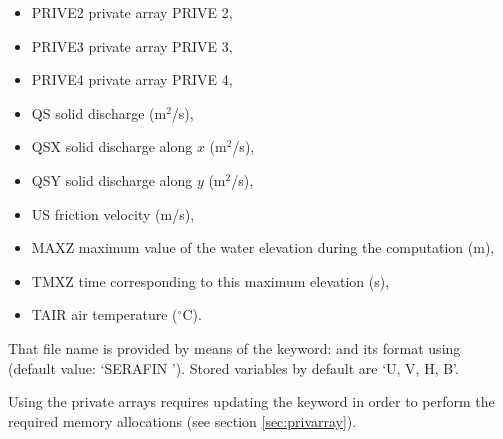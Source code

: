 \begin{itemize}
\item PRIVE2 private array PRIVE 2,

\item PRIVE3 private array PRIVE 3,

\item PRIVE4 private array PRIVE 4,

\item QS  solid discharge (m${}^{2}$/s),

\item QSX  solid discharge along $x$ (m${}^{2}$/s),

\item QSY  solid discharge along $y$ (m${}^{2}$/s),

\item US  friction velocity (m/s),

\item MAXZ  maximum value of the water elevation during the computation (m),

\item TMXZ  time corresponding to this maximum elevation (s),








\item TAIR  air temperature ($^{\circ}$C).
\end{itemize}

That file name is provided by means of the keyword:  and
its format using  (default value: `SERAFIN ').
Stored variables by default are `U, V, H, B'.

Using the private arrays requires updating the keyword  in order to perform the required memory allocations (see
section \ref{sec:privarray}).

